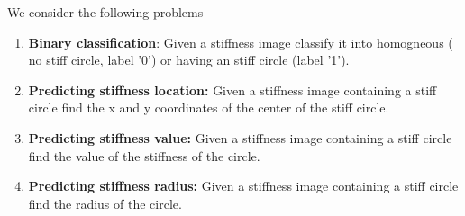 \documentclass{article}
\begin{document}
We consider the following problems
\begin{enumerate}
\item{\textbf{Binary classification}: Given a stiffness image classify it into homogneous ( no stiff circle, label '0') or having an stiff circle (label '1').}
\item{\textbf{Predicting stiffness location:} Given a stiffness image containing a stiff circle find the x and y coordinates of the center of the stiff circle.}
\item{\textbf{Predicting stiffness value:} Given a stiffness image containing a stiff circle find the value of the stiffness of the circle.}
\item{\textbf{Predicting stiffness radius:} Given a stiffness image containing a stiff circle find the radius of the circle.}
\end{enumerate}
\end{document}

